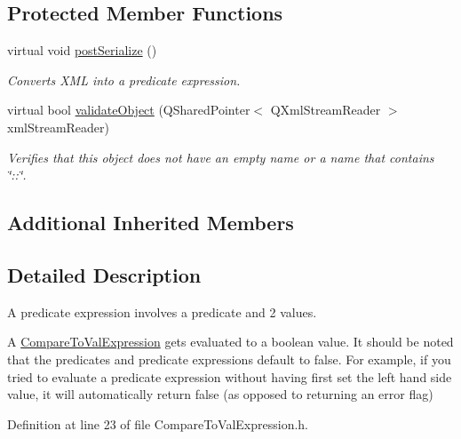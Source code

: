 \subsection*{Protected Member Functions}
\begin{DoxyCompactItemize}
\item 
virtual void \hyperlink{class_picto_1_1_compare_to_val_expression_a3071487a97a15b80483e5b3d8633a9df}{post\-Serialize} ()
\begin{DoxyCompactList}\small\item\em Converts X\-M\-L into a predicate expression. \end{DoxyCompactList}\item 
\hypertarget{class_picto_1_1_compare_to_val_expression_a07786067a55a101d71142d01c7ddef7f}{virtual bool \hyperlink{class_picto_1_1_compare_to_val_expression_a07786067a55a101d71142d01c7ddef7f}{validate\-Object} (Q\-Shared\-Pointer$<$ Q\-Xml\-Stream\-Reader $>$ xml\-Stream\-Reader)}\label{class_picto_1_1_compare_to_val_expression_a07786067a55a101d71142d01c7ddef7f}

\begin{DoxyCompactList}\small\item\em Verifies that this object does not have an empty name or a name that contains \char`\"{}\-::\char`\"{}. \end{DoxyCompactList}\end{DoxyCompactItemize}
\subsection*{Additional Inherited Members}


\subsection{Detailed Description}
A predicate expression involves a predicate and 2 values. 

A \hyperlink{class_picto_1_1_compare_to_val_expression}{Compare\-To\-Val\-Expression} gets evaluated to a boolean value. It should be noted that the predicates and predicate expressions default to false. For example, if you tried to evaluate a predicate expression without having first set the left hand side value, it will automatically return false (as opposed to returning an error flag) 

Definition at line 23 of file Compare\-To\-Val\-Expression.\-h.



